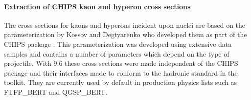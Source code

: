 \paragraph{Extraction of CHIPS kaon and hyperon cross sections}
The cross sections for kaons and hyperons incident upon nuclei are based on the
parameterization by Kossov and Degtyarenko who developed them as part of the 
CHIPS package \cite{hadbib:CHIPS}.  This parameterization was developed using 
extensive data samples and contains a number of parameters which depend on the
type of projectile.  With \Gfour{} 9.6 these cross sections were made 
independent of the CHIPS package and their interfaces made to conform to the 
hadronic standard in the toolkit.  They are currently used by default in 
production physics lists such as FTFP\_BERT and QGSP\_BERT.

